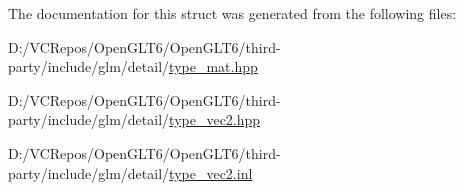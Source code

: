 The documentation for this struct was generated from the following files\+:\begin{DoxyCompactItemize}
\item 
D\+:/\+V\+C\+Repos/\+Open\+G\+L\+T6/\+Open\+G\+L\+T6/third-\/party/include/glm/detail/\mbox{\hyperlink{type__mat_8hpp}{type\+\_\+mat.\+hpp}}\item 
D\+:/\+V\+C\+Repos/\+Open\+G\+L\+T6/\+Open\+G\+L\+T6/third-\/party/include/glm/detail/\mbox{\hyperlink{type__vec2_8hpp}{type\+\_\+vec2.\+hpp}}\item 
D\+:/\+V\+C\+Repos/\+Open\+G\+L\+T6/\+Open\+G\+L\+T6/third-\/party/include/glm/detail/\mbox{\hyperlink{type__vec2_8inl}{type\+\_\+vec2.\+inl}}\end{DoxyCompactItemize}
